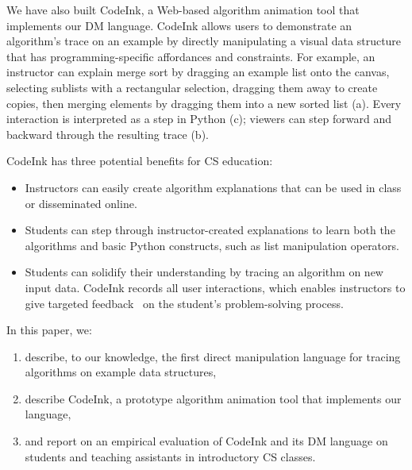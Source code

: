 We have also built CodeInk, a Web-based algorithm animation tool that implements
our DM language. CodeInk allows users to demonstrate an algorithm's trace on an
example by directly manipulating a visual data structure that has
programming-specific affordances and constraints. For example, an instructor can
explain merge sort by dragging an example list onto the canvas, selecting
sublists with a rectangular selection, dragging them away to create copies, then
merging elements by dragging them into a new sorted list
(a). Every interaction is interpreted as a step in Python
(c); viewers can step forward and backward through the
resulting trace (b).

CodeInk has three potential benefits for CS education:

\begin{itemize}\itemsep2pt

\item Instructors can easily create algorithm explanations that can be
used in class or disseminated online.

\item Students can step through instructor-created explanations to learn
both the algorithms and basic Python constructs, such as list
manipulation operators.

\item Students can solidify their understanding by tracing an algorithm on new
input data. CodeInk records all user interactions, which enables instructors to
give targeted feedback~\cite{Balzer1989} on the student's problem-solving
process.

\end{itemize}


\newpage
In this paper, we:%

\begin{enumerate} %

\item describe, to our knowledge, the first direct manipulation language
for tracing algorithms on example data structures,

\item describe CodeInk, a prototype algorithm animation tool that
implements our language,

\item and report on an empirical evaluation of CodeInk and its DM
language on students and teaching assistants in introductory CS classes.

\end{enumerate}

